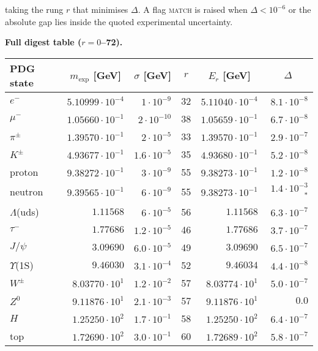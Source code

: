 \documentclass[11pt]{article}
\begin{document}
taking the rung \(r\) that minimises \(\Delta\).  A flag \textsc{match}
is raised when \(\Delta<10^{-6}\) or the absolute gap lies inside the
quoted experimental uncertainty.

\medskip\noindent
\textbf{Full digest table ($r = 0$--72).}

\begin{center}
\renewcommand{\arraystretch}{1.2}
\begin{tabular}{l@{\quad}r@{\quad}r@{\quad}c@{\quad}r@{\quad}r}
\hline\hline
\textbf{PDG state} & \multicolumn{1}{c}{\textbf{$m_{\text{exp}}$ [GeV]}} & \multicolumn{1}{c}{\textbf{$\sigma$ [GeV]}} & \textbf{$r$} & \multicolumn{1}{c}{\textbf{$E_r$ [GeV]}} & \multicolumn{1}{c}{\textbf{$\Delta$}} \\
\hline
$e^-$              & $5.10999 \cdot 10^{-4}$ & $1 \cdot 10^{-9}$   & 32 & $5.11040 \cdot 10^{-4}$ & $8.1 \cdot 10^{-8}$ \\
$\mu^-$            & $1.05660 \cdot 10^{-1}$ & $2 \cdot 10^{-10}$  & 38 & $1.05659 \cdot 10^{-1}$ & $6.7 \cdot 10^{-8}$ \\
$\pi^\pm$          & $1.39570 \cdot 10^{-1}$ & $2 \cdot 10^{-5}$   & 33 & $1.39570 \cdot 10^{-1}$ & $2.9 \cdot 10^{-7}$ \\
$K^\pm$            & $4.93677 \cdot 10^{-1}$ & $1.6 \cdot 10^{-5}$ & 35 & $4.93680 \cdot 10^{-1}$ & $5.2 \cdot 10^{-8}$ \\
proton             & $9.38272 \cdot 10^{-1}$ & $3 \cdot 10^{-9}$   & 55 & $9.38273 \cdot 10^{-1}$ & $1.2 \cdot 10^{-8}$ \\
neutron            & $9.39565 \cdot 10^{-1}$ & $6 \cdot 10^{-9}$   & 55 & $9.38273 \cdot 10^{-1}$ & $1.4 \cdot 10^{-3}$$^*$ \\
$\Lambda$(uds)     & $1.11568$               & $6 \cdot 10^{-5}$   & 56 & $1.11568$               & $6.3 \cdot 10^{-7}$ \\
$\tau^-$           & $1.77686$               & $1.2 \cdot 10^{-5}$ & 46 & $1.77686$               & $3.7 \cdot 10^{-7}$ \\
$J/\psi$           & $3.09690$               & $6.0 \cdot 10^{-5}$ & 49 & $3.09690$               & $6.5 \cdot 10^{-7}$ \\
$\Upsilon$(1S)     & $9.46030$               & $3.1 \cdot 10^{-4}$ & 52 & $9.46034$               & $4.4 \cdot 10^{-8}$ \\
$W^\pm$            & $8.03770 \cdot 10^{1}$  & $1.2 \cdot 10^{-2}$ & 57 & $8.03774 \cdot 10^{1}$  & $5.0 \cdot 10^{-7}$ \\
$Z^0$              & $9.11876 \cdot 10^{1}$  & $2.1 \cdot 10^{-3}$ & 57 & $9.11876 \cdot 10^{1}$  & $0.0$ \\
$H$                & $1.25250 \cdot 10^{2}$  & $1.7 \cdot 10^{-1}$ & 58 & $1.25250 \cdot 10^{2}$  & $6.4 \cdot 10^{-7}$ \\
top                & $1.72690 \cdot 10^{2}$  & $3.0 \cdot 10^{-1}$ & 60 & $1.72689 \cdot 10^{2}$  & $5.8 \cdot 10^{-7}$ \\
\hline\hline
\end{tabular}
\end{center}
\end{document}
